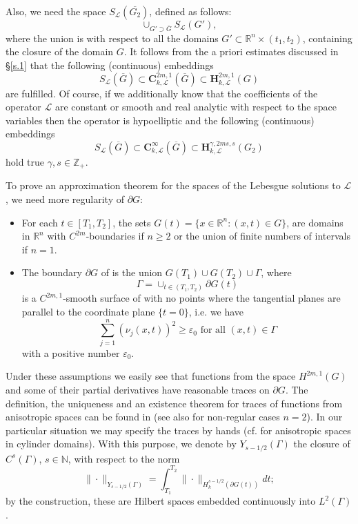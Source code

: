 \documentclass{amsart}
\theoremstyle{definition}
\theoremstyle{remark}
\numberwithin{equation}{section}
\begin{document}
Also, we need the space  $S _{\mathcal L}(\overline{G_2})$, 
defined as follows: 
$$
\cup_{G' \supset 
\overline{G} } S _{\mathcal L}(G'),
$$
where the union is with respect to all the domains $G' \subset {\mathbb R}^{n} \times 
(t_1, t_2)$,  containing the closure of the domain  $G$.
It follows from the a priori estimates discussed in \S \ref{s.1}
that the following (continuous) embeddings 
\begin{equation} \label{eq.emb.H}
S _{\mathcal L}(\overline{G}) \subset 
\mathbf{C}^{2m,1} _{k,\mathcal L} (\overline{G}) \subset
\mathbf{H}^{2m,1} _{k,\mathcal L}(G) 
\end{equation}
are fulfilled. Of course, if we additionally know that the coefficients of the operator 
${\mathcal L}$ are constant or smooth and real analytic with respect to the space variables 
then the operator is hypoelliptic and the following (continuous) embeddings 
\begin{equation} \label{eq.emb.H.infty}
S _{\mathcal L}(\overline{G}) \subset 
\mathbf{C}^{\infty} _{k,\mathcal L} (\overline{G}) \subset
\mathbf{H}^{\gamma,2ms,s} _{k,\mathcal L}(G_2) 
\end{equation} 
hold true  $\gamma,s\in {\mathbb Z}_+$. 

To prove an approximation theorem for the spaces of the Lebesgue solutions to 
$\mathcal L$,  we need more regularity of $\partial G$:  
\begin{itemize}
\item[(A1)]    
For each $t\in [T_1, T_2]$, the sets  
$G (t) = \{x \in {\mathbb R}^n: (x,t) \in G\}$, 
are  domains in ${\mathbb R}^n$ with $C^{2m}$-boundaries if $n\geq 2$ 
 or the union of finite numbers of intervals if $n=1$.
\item[(A2)] 
The boundary $\partial G$ of is the union $G (T_1)\cup  G (T_2) \cup \Gamma $, where 
$$\Gamma =\cup_{t\in (T_1,T_2)} \partial G (t)$$ 
is a $C^{2m,1}$-smooth surface of with 
no points where the tangential planes are parallel to the coordinate plane $\{t=0\}$, i.e. 
we have 
$$
\sum_{j=1}^n  (\nu_j (x,t))^2 \geq \varepsilon _0 \mbox{ for all } (x,t) \in \Gamma
$$
with a positive number $\varepsilon _0$.
\end{itemize}

Under these assumptions we easily see that functions from the space $H^{2m,1} (G)$ and  
some of their partial derivatives have reasonable traces on $\partial G$. The definition, 
the uniqueness and an existence theorem for traces of functions from anisotropic spaces can 
be found in \cite[\S 10]{BeINi} (see also \cite[Ch 2.]{UDP} for non-regular cases $n=2$). In our particular situation we may 
specify the traces  by hands (cf. \cite[Ch.3, \S 7]{MikhX} for anisotropic spaces in cylinder 
domains). With this purpose, we denote by $Y_{s-1/2} (\Gamma)$ the closure  of ${C}^{s} 
(\Gamma)$, $s \in \mathbb N$, with respect to the norm 
$$
\|\cdot\|_{Y_{s-1/2}(\Gamma)} = \int_{T_1}^{T_2} 
\|\cdot\|_{H^{s-1/2}_k (\partial G (t))} dt;
$$
by the construction, these are Hilbert spaces embedded continuously 
into ${L} ^2 (\Gamma)$. 
\end{document}
